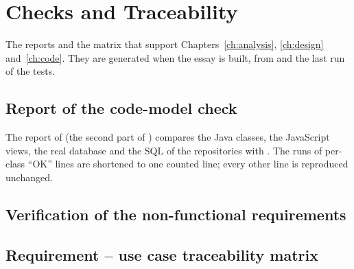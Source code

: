 \renewcommand{\chaptermark}[1]{\markboth{Appendix \thechapter}{}}%

\chapter{Checks and Traceability}\label{app:checks}\label{app:A}

The reports and the matrix that support Chapters~\ref{ch:analysis}, \ref{ch:design} and~\ref{ch:code}. They are
generated when the essay is built, from  and the last run of the tests.

\section{Report of the code-model check}\label{sec:B.7}

The report of  (the second part of ) compares the Java
classes, the JavaScript views, the real database and the SQL of the repositories with . The runs
of per-class ``OK'' lines are shortened to one counted line; every other line is reproduced unchanged.


\section{Verification of the non-functional requirements}\label{sec:C.1}



\section{Requirement -- use case traceability matrix}\label{sec:C.2}


